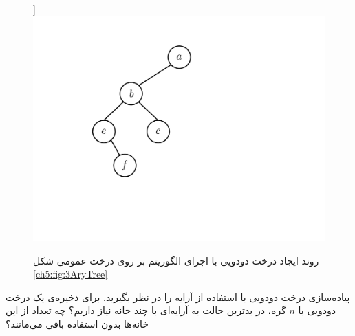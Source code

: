 \begin{figure}
\begin{center}
]{\includegraphics[scale=0.33]{figs/ch5/lcrs_3.pdf}\label{ch5:fig:lcrs3}}\qquad
{}
\caption{%
روند ایجاد درخت دودویی با اجرای الگوریتم {} بر روی درخت عمومی شکل {\eqref{ch5:fig:3AryTree}}
}\label{ch5:fig:lcrs}
\end{center}
\end{figure}

 پیاده‌سازی درخت دودویی با استفاده از آرایه را در نظر بگیرید. برای ذخیره‌ی یک درخت دودویی با {$n$} گره، در بدترین حالت به آرایه‌ای با چند خانه‌ نیاز داریم؟ چه تعداد از این خانه‌ها بدون استفاده باقی می‌مانند؟


